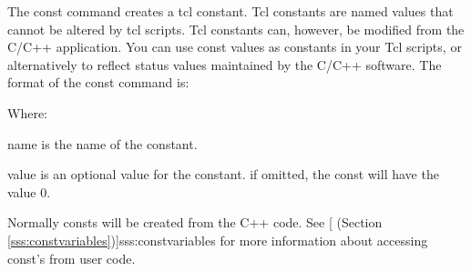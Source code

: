 	 The const command creates a tcl constant.  Tcl constants
      are named values that cannot be altered by tcl scripts.  Tcl
      constants can, however, be modified from the C/C++ application.
      You can use const values as constants in your Tcl scripts,
      or alternatively to reflect status values maintained by the
      C/C++ software.   The format of  the const command is:
      \begin{example}
      \computer{\% }
      \end{example}
      
      Where:
      \begin{description}
	 \item{name} is the name of the constant.
	 \item{value} is an optional value for the constant.
	    if omitted, the const will have the value 0.
      \end{description}

      Normally consts will be created from the C++ code.
      See
      [
      (Section \ref{sss:constvariables})]{sss:constvariables} for
      more information about accessing const's from user code.
      
